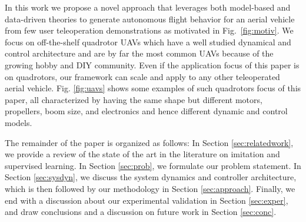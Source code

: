 \documentclass[letterpaper, 10 pt, conference]{ieeeconf}  %
\newcommand\NB[1]{$\spadesuit$\footnote{NB: #1}}
\begin{document}
In this work we propose a novel approach that leverages both model-based and data-driven theories to generate autonomous flight behavior for an aerial vehicle from few user teleoperation demonstrations as motivated in Fig.~\ref{fig:motiv}. 
We focus on off-the-shelf quadrotor UAVs which have a well studied dynamical and control architecture and are by far the most common UAVs because of the growing hobby and DIY community. Even if the application focus of this paper is on quadrotors, our framework can scale and apply to any other teleoperated aerial vehicle. Fig. \ref{fig:uavs} shows some examples of such quadrotors focus of this paper, all characterized by having the same shape but different motors, propellers, boom size, and electronics and hence different dynamic and control models.



The remainder of the paper is organized as follows: In Section \ref{sec:relatedwork}, we provide a review of the state of the art in the literature on imitation and supervised learning. In Section \ref{sec:prob}, we formulate our problem statement. In Section \ref{sec:sysdyn}, we discuss the system dynamics and controller architecture, which is then followed by our methodology in Section \ref{sec:approach}. Finally, we end with a discussion about our experimental validation in Section \ref{sec:exper}, and draw conclusions and a discussion on future work in Section \ref{sec:conc}.

 
 
\end{document}
